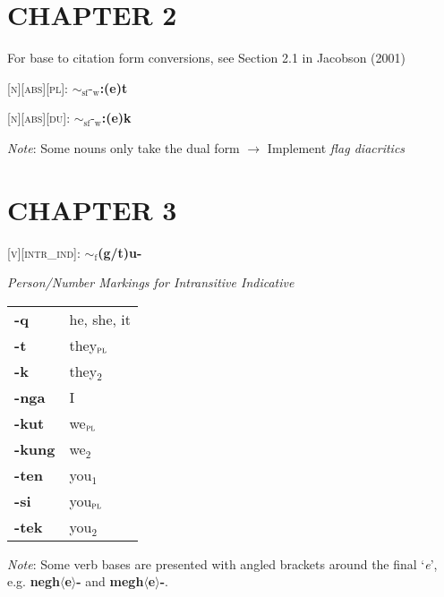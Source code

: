 \documentclass{article}
\begin{document}
\section*{CHAPTER 2}
For base to citation form conversions, see Section 2.1 in Jacobson (2001)

\bigskip

\textsc{[n][abs][pl]}: \textbf{${\sim}_\text{sf}\text{-}_\text{w}$:(e)t}

\noindent \textsc{[n][abs][du]}: \textbf{${\sim}_\text{sf}\text{-}_\text{w}$:(e)k}

\bigskip

\textit{Note}: Some nouns only take the dual form $\rightarrow$ Implement \textit{flag diacritics}

\section*{CHAPTER 3}

\noindent \textsc{[v][intr\_ind]}: \textbf{${\sim}_\text{f}$(g/t)u-}

\bigskip

\textit{Person/Number Markings for Intransitive Indicative}

\begin{tabular}{ l l }
\textbf{-q} & he, she, it \\
\textbf{-t} & they$_\text{\textsc{pl}}$ \\
\textbf{-k} & they$_\text{2}$ \\
\textbf{-nga} & I \\
\textbf{-kut} & we$_\text{\textsc{pl}}$ \\
\textbf{-kung} & we$_\text{2}$ \\
\textbf{-ten} & you$_\text{1}$ \\
\textbf{-si} & you$_\text{\textsc{pl}}$ \\
\textbf{-tek} & you$_\text{2}$
\end{tabular}

\bigskip

\textit{Note}: Some verb bases are presented with angled brackets around the final `\textit{e}', e.g. \textbf{negh$\langle$e$\rangle$-} and \textbf{megh$\langle$e$\rangle$-}.
\end{document}
